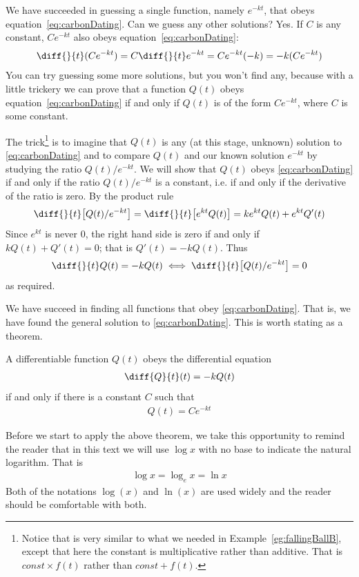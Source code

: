 We have succeeded in guessing a single function, namely $e^{-kt}$, that obeys
equation~\eqref{eq:carbonDating}. Can we guess any other solutions? Yes.
If $C$ is any constant, $Ce^{-kt}$ also obeys equation~\eqref{eq:carbonDating}:
\begin{align*}
\diff{}{t}(Ce^{-kt}) = C\diff{}{t}e^{-kt} = Ce^{-kt}(-k) = -k (Ce^{-kt})
\end{align*}
You can try guessing some more solutions, but you won't find any,
because with a little trickery we can prove that a function $Q(t)$
obeys equation~\eqref{eq:carbonDating} if and only if $Q(t)$ is of the form
$Ce^{-kt}$, where $C$ is some constant.


The trick\footnote{
Notice that is very similar to what we needed in Example~\ref{eg:fallingBallB},
except that here the constant is multiplicative rather than additive. That is
$const \times f(t)$ rather than $const + f(t)$.
} is to imagine that $Q(t)$ is any (at this stage, unknown) solution to
\eqref{eq:carbonDating} and to compare $Q(t)$ and our known solution $e^{-kt}$
by studying the ratio $Q(t)/e^{-kt}$. We will show that $Q(t)$ obeys
\eqref{eq:carbonDating} if and only if the ratio $Q(t)/e^{-kt}$ is a constant,
i.e. if and only if the derivative of the ratio is zero. By the product rule
\begin{align*}
\diff{}{t}\big[Q(t)/e^{-kt}\big]=
\diff{}{t}\big[e^{kt}Q(t)\big]
=ke^{kt} Q(t)+e^{kt}Q'(t)
\end{align*}
Since $e^{kt}$ is never $0$, the right hand side is zero if and only if
$k Q(t)+Q'(t)=0$; that is $Q'(t)=-kQ(t)$. Thus
\begin{align*}
\diff{}{t}Q(t) = -k Q(t)
\iff
\diff{}{t}\big[Q(t)/e^{-kt}\big]
=0
\end{align*}
as required.

We have succeed in finding all functions that obey \eqref{eq:carbonDating}.
That is, we have found the general solution to \eqref{eq:carbonDating}.
This is worth stating as a theorem.
\begin{theorem}\label{thm:growthDEsoln}
A differentiable function $Q(t)$ obeys the differential equation
\begin{align*}
\diff{Q}{t}(t)=-k Q(t)
\end{align*}
if and only if there is a constant $C$ such that
\begin{align*}
Q(t)= C e^{-kt}
\end{align*}
\end{theorem}

Before we start to apply the above theorem, we take this opportunity to remind the reader
that in this text we will use $\log x$ with no base to indicate the natural logarithm.
That is
\begin{align*}
  \log x = \log_e x = \ln x
\end{align*}
Both of the notations $\log(x)$ and $\ln(x)$ are used widely and the reader should be
comfortable with both.

